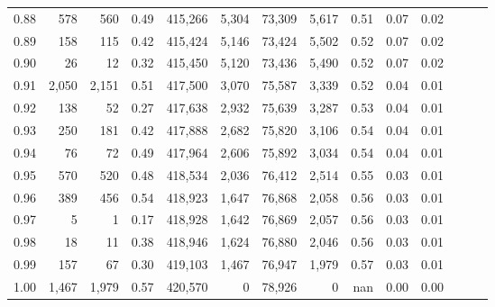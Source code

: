 \begin{tabular}{rrrrrrrrrrrrrr}
0.88 &     578 &    560 &  0.49 &  415,266 &    5,304 &  73,309 &   5,617 &  0.51 &  0.07 &      0.02 \\
0.89 &     158 &    115 &  0.42 &  415,424 &    5,146 &  73,424 &   5,502 &  0.52 &  0.07 &      0.02 \\
0.90 &      26 &     12 &  0.32 &  415,450 &    5,120 &  73,436 &   5,490 &  0.52 &  0.07 &      0.02 \\
0.91 &   2,050 &  2,151 &  0.51 &  417,500 &    3,070 &  75,587 &   3,339 &  0.52 &  0.04 &      0.01 \\
0.92 &     138 &     52 &  0.27 &  417,638 &    2,932 &  75,639 &   3,287 &  0.53 &  0.04 &      0.01 \\
0.93 &     250 &    181 &  0.42 &  417,888 &    2,682 &  75,820 &   3,106 &  0.54 &  0.04 &      0.01 \\
0.94 &      76 &     72 &  0.49 &  417,964 &    2,606 &  75,892 &   3,034 &  0.54 &  0.04 &      0.01 \\
0.95 &     570 &    520 &  0.48 &  418,534 &    2,036 &  76,412 &   2,514 &  0.55 &  0.03 &      0.01 \\
0.96 &     389 &    456 &  0.54 &  418,923 &    1,647 &  76,868 &   2,058 &  0.56 &  0.03 &      0.01 \\
0.97 &       5 &      1 &  0.17 &  418,928 &    1,642 &  76,869 &   2,057 &  0.56 &  0.03 &      0.01 \\
0.98 &      18 &     11 &  0.38 &  418,946 &    1,624 &  76,880 &   2,046 &  0.56 &  0.03 &      0.01 \\
0.99 &     157 &     67 &  0.30 &  419,103 &    1,467 &  76,947 &   1,979 &  0.57 &  0.03 &      0.01 \\
1.00 &   1,467 &  1,979 &  0.57 &  420,570 &        0 &  78,926 &       0 &   nan &  0.00 &      0.00 \\
\bottomrule
\end{tabular}
